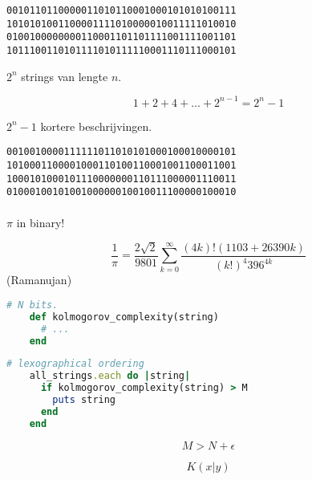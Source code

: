 \documentclass[]{beamer}
\begin{document}
\begin{frame}
  \texttt{0010110110000011010110001000101010100111\\
          1010101001100001111010000010011111010010\\
          0100100000000110001101101111001111001101\\
          1011100110101111010111110001110111000101}
\end{frame}

\begin{frame}
  $2^n$ strings van lengte $n$.

  $$1 + 2 + 4 + \dots + 2^{n-1} = 2^n - 1$$

  $2^n - 1$ kortere beschrijvingen.
\end{frame}

\begin{frame}
  \texttt{0010010000111111011010101000100010000101\\
          1010001100001000110100110001001100011001\\
          1000101000101110000000110111000001110011\\
          0100010010100100000010010011100000100010}\\~\\

  \pause
  $\pi$ in binary!
\end{frame}

\begin{frame}
  $$\frac1{\pi} = \frac{2\sqrt{2}}{9801} \sum_{k=0}^\infty \frac{(4k)!(1103+26390k)}{(k!)^4 396^{4k}}\!$$
  (Ramanujan)
\end{frame}

\begin{frame}[fragile]
  \begin{lstlisting}[language=Ruby]
    # N bits.
    def kolmogorov_complexity(string)
      # ...
    end
  \end{lstlisting}

  \pause

  \begin{lstlisting}[language=Ruby]
    # lexographical ordering
    all_strings.each do |string|
      if kolmogorov_complexity(string) > M
        puts string
      end
    end
  \end{lstlisting}

  \pause

  $$ M > N + \epsilon $$
\end{frame}

\begin{frame}
   $$K(x|y)$$
\end{frame}
\end{document}
